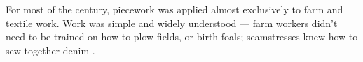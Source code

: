 \documentclass[trackingWork]{subfiles}
\begin{document}
For most of the  century,
piecework was applied almost exclusively to farm and textile work.
Work was simple and widely understood
--- farm workers didn't need to be trained on how to plow fields, or birth foals;
seamstresses knew how to sew together denim
\cite{10.2307/2338394,riisOtherSideLives}.
\end{document}
